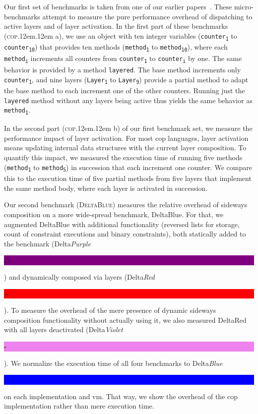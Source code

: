 \documentclass[preprint,english,10pt,nonatbib]{sigplanconf}
\DeclareRobustCommand*\copa{\textsc{cop}\kern .12em\oldstylenums{09}\kern .12em a\xspace}
\DeclareRobustCommand*\copb{\textsc{cop}\kern .12em\oldstylenums{09}\kern .12em b\xspace}
\DeclareRobustCommand*\deltablue{\textsc{DeltaBlue}\xspace}
\begin{document}
Our first set of benchmarks is taken from one of our earlier
papers~\cite{appeltauer+:2009:comparison-context-oriented}. These
micro-benchmarks attempt to measure the pure performance overhead of
dispatching to active layers and of layer activation. In the first part of
these benchmarks (\copa), we use an object with ten integer variables
(\texttt{counter\textsubscript{1}} to \texttt{counter\textsubscript{10}}) that
provides ten methods (\texttt{method\textsubscript{1}} to
\texttt{method\textsubscript{10}}), where each \texttt{method\textsubscript{i}}
increments all counters from \texttt{counter\textsubscript{1}} to
\texttt{counter\textsubscript{i}} by one. The same behavior is provided by a
method \texttt{layered}. The base method increments only
\texttt{counter\textsubscript{1}}, and nine layers
(\texttt{Layer\textsubscript{1}} to \texttt{Layer\textsubscript{9}}) provide a
partial method to adapt the base method to each increment one of the other
counters. Running just the \texttt{layered} method without any layers being
active thus yields the same behavior as \texttt{method\textsubscript{1}}.


In the second part (\copb) of our first benchmark set, we measure the
performance impact of layer activation. For most \ac{cop} languages, layer
activation means updating internal data structures with the current layer
composition. To quantify this impact, we measured the execution time of running
five methods (\texttt{method\textsubscript{1}} to
\texttt{method\textsubscript{5}}) in succession that each increment one
counter. We compare this to the execution time of five partial methods from
five layers that implement the same method body, where each layer is activated
in succession.


\def\idBox#1#2{%
\setlength{\fboxsep}{1pt}%
\colorbox{#1}{\textcolor[gray]{0.9}{\rule[0.1pt]{0pt}{5pt}#2}}%
\xspace}

Our second benchmark (\deltablue) measures the relative overhead of sideways
composition on a more wide-spread benchmark, DeltaBlue. For that, we augmented
DeltaBlue with additional functionality (reversed lists for storage, count of
constraint executions and binary constraints), both statically added to the
benchmark (Delta\emph{Purple}~\idBox{purple}{\(\bigtriangleup\)})
and dynamically composed via layers (Delta\emph{Red}~\idBox{red}{\(+\)}).
To measure the overhead of the mere presence of dynamic sideways composition
functionality without actually using it, we also measured DeltaRed with all
layers deactivated (Delta\emph{Violet} ~\idBox{violet}{\(\square\)}).
We normalize the execution time of all four benchmarks to
Delta\emph{Blue}~\idBox{blue}{\(\circ\)}
on each implementation and \ac{vm}. That way, we show the overhead of the
\ac{cop} implementation rather than mere execution time.
\end{document}
